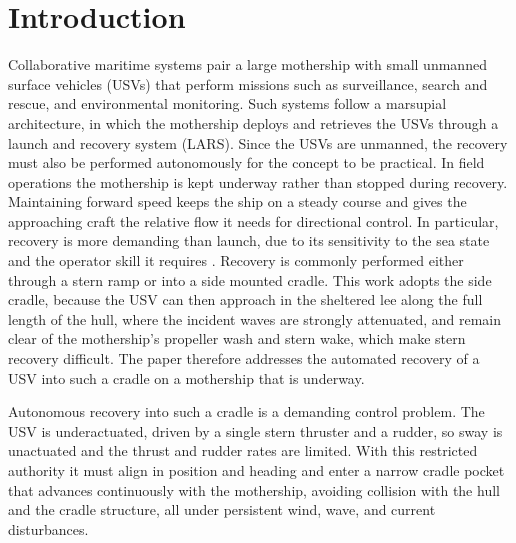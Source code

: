 \documentclass[5p,times,authoryear]{elsarticle}
\begin{document}
\section{Introduction}\label{sec_intro}

Collaborative maritime systems pair a large mothership with small unmanned surface vehicles (USVs) that perform missions such as surveillance, search and rescue, and environmental monitoring. Such systems follow a marsupial architecture, in which the mothership deploys and retrieves the USVs through a launch and recovery system (LARS). Since the USVs are unmanned, the recovery must also be performed autonomously for the concept to be practical. In field operations the mothership is kept underway rather than stopped during recovery. Maintaining forward speed keeps the ship on a steady course and gives the approaching craft the relative flow it needs for directional control. In particular, recovery is more demanding than launch, due to its sensitivity to the sea state and the operator skill it requires \citep{sheinberg2003stern, sheinberg2010operational, chun2012experimental}. Recovery is commonly performed either through a stern ramp or into a side mounted cradle. This work adopts the side cradle, because the USV can then approach in the sheltered lee along the full length of the hull, where the incident waves are strongly attenuated, and remain clear of the mothership's propeller wash and stern wake, which make stern recovery difficult. The paper therefore addresses the automated recovery of a USV into such a cradle on a mothership that is underway.

Autonomous recovery into such a cradle is a demanding control problem. The USV is underactuated, driven by a single stern thruster and a rudder, so sway is unactuated and the thrust and rudder rates are limited. With this restricted authority it must align in position and heading and enter a narrow cradle pocket that advances continuously with the mothership, avoiding collision with the hull and the cradle structure, all under persistent wind, wave, and current disturbances.
\end{document}
